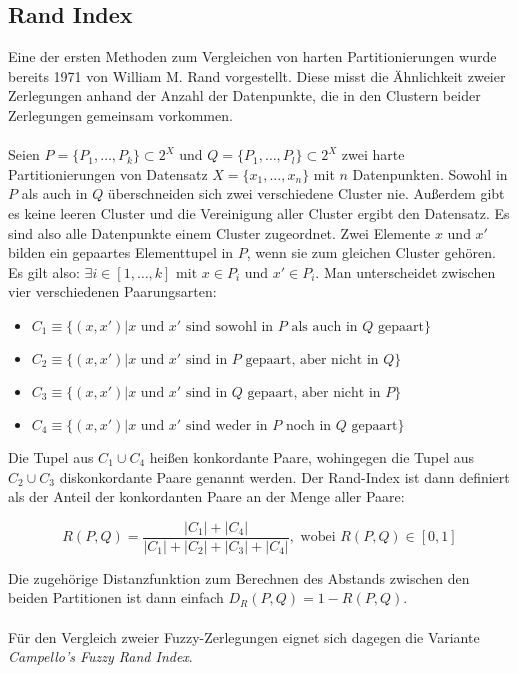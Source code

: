 \documentclass[11pt,ceqn]{book}
\begin{document}
\subsection{Rand Index}
Eine der ersten Methoden zum Vergleichen von harten Partitionierungen wurde bereits 1971 von William M. Rand \cite{rand} vorgestellt. Diese misst die Ähnlichkeit zweier Zerlegungen anhand der Anzahl der Datenpunkte, die in den Clustern beider Zerlegungen gemeinsam vorkommen. \\~\\
Seien $P = \{P_1, \dots, P_k\} \subset 2^X$ und  $Q = \{P_1, \dots, P_l\} \subset 2^X$ zwei harte Partitionierungen von Datensatz $X=\{x_1,\dots,x_n\}$ mit $n$ Datenpunkten. Sowohl in $P$ als auch in $Q$ überschneiden sich zwei verschiedene Cluster nie. Außerdem gibt es keine leeren Cluster und die Vereinigung aller Cluster ergibt den Datensatz. Es sind also alle Datenpunkte einem Cluster zugeordnet. Zwei Elemente $x$ und $x'$ bilden ein gepaartes Elementtupel in $P$, wenn sie zum gleichen Cluster gehören. Es gilt also: $\exists i \in \left[1,\dots,k\right] \text{ mit } x \in P_i \text{ und } x' \in P_i$. Man unterscheidet zwischen vier verschiedenen Paarungsarten:

\begin{itemize}
\item $C_1 \equiv \{(x,x')|  x \text{ und } x' \text{ sind sowohl in } P \text{ als auch in } Q \text{ gepaart}\}$
\item $C_2 \equiv \{(x,x')|  x \text{ und } x' \text{ sind in } P \text{ gepaart, aber nicht in } Q\}$
\item $C_3 \equiv \{(x,x')| x \text{ und } x' \text{ sind in } Q \text{ gepaart, aber nicht in } P\}$
\item $C_4 \equiv \{(x,x')|  x \text{ und } x' \text{ sind weder in } P \text{ noch in } Q \text{ gepaart}\}$
\end{itemize}

Die Tupel aus $C_1 \cup C_4$ heißen konkordante Paare, wohingegen die Tupel aus $C_2 \cup C_3$ diskonkordante Paare genannt werden. Der Rand-Index ist dann definiert als der Anteil der konkordanten Paare an der Menge aller Paare:

$$R(P,Q) = \frac{|C_1|+|C_4|}{|C_1|+|C_2|+|C_3|+|C_4|}, \text{ wobei } R(P,Q) \in \left[0,1 \right]$$

Die zugehörige Distanzfunktion zum Berechnen des Abstands zwischen den beiden Partitionen ist dann einfach $D_R(P,Q) = 1-R(P,Q)$.
\\~\\
Für den Vergleich zweier Fuzzy-Zerlegungen eignet sich dagegen die Variante \textit{Campello's Fuzzy Rand Index}.
\end{document}
